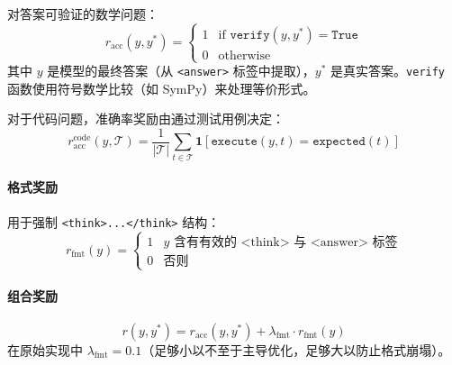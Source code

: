 对答案可验证的数学问题：
\begin{equation}
    r_{\text{acc}}(y, y^*) = \begin{cases} 1 & \text{if } \texttt{verify}(y, y^*) = \texttt{True} \\ 0 & \text{otherwise} \end{cases}
\end{equation}
其中 $y$ 是模型的最终答案（从 \texttt{<answer>} 标签中提取），$y^*$ 是真实答案。\texttt{verify} 函数使用符号数学比较（如 SymPy）来处理等价形式。

对于代码问题，准确率奖励由通过测试用例决定：
\begin{equation}
    r_{\text{acc}}^{\text{code}}(y, \mathcal{T}) = \frac{1}{|\mathcal{T}|} \sum_{t \in \mathcal{T}} \mathbf{1}[\texttt{execute}(y, t) = \texttt{expected}(t)]
\end{equation}

\paragraph{格式奖励}
\label{format-reward}

用于强制 \texttt{<think>...</think>} 结构：
\begin{equation}
    r_{\text{fmt}}(y) = \begin{cases} 1 & y \text{ 含有有效的 <think> 与 <answer> 标签} \\ 0 & \text{否则} \end{cases}
\end{equation}

\paragraph{组合奖励}
\label{combined-reward}

\begin{equation}
    r(y, y^*) = r_{\text{acc}}(y, y^*) + \lambda_{\text{fmt}} \cdot r_{\text{fmt}}(y)
\end{equation}
在原始实现中 $\lambda_{\text{fmt}} = 0.1$（足够小以不至于主导优化，足够大以防止格式崩塌）。

